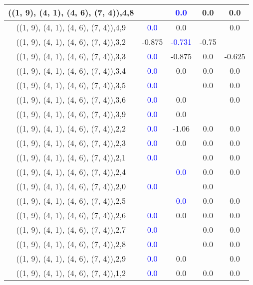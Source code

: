 \documentclass{article}
\begin{document}
\begin{center}
\begin{longtable}{|c|c|c|c|c|}
        	\hline
        	((1, 9), (4, 1), (4, 6), (7, 4)),4,8&& \textcolor{blue}{0.0}&0.0&0.0\\
        	\hline
        	((1, 9), (4, 1), (4, 6), (7, 4)),4,9& \textcolor{blue}{0.0}&0.0&&0.0\\
        	\hline
        	((1, 9), (4, 1), (4, 6), (7, 4)),3,2&-0.875& \textcolor{blue}{-0.731}&-0.75&\\
        	\hline
        	((1, 9), (4, 1), (4, 6), (7, 4)),3,3& \textcolor{blue}{0.0}&-0.875&0.0&-0.625\\
        	\hline
        	((1, 9), (4, 1), (4, 6), (7, 4)),3,4& \textcolor{blue}{0.0}&0.0&0.0&0.0\\
        	\hline
        	((1, 9), (4, 1), (4, 6), (7, 4)),3,5& \textcolor{blue}{0.0}&&0.0&0.0\\
        	\hline
        	((1, 9), (4, 1), (4, 6), (7, 4)),3,6& \textcolor{blue}{0.0}&0.0&&0.0\\
        	\hline
        	((1, 9), (4, 1), (4, 6), (7, 4)),3,9& \textcolor{blue}{0.0}&0.0&&\\
        	\hline
        	((1, 9), (4, 1), (4, 6), (7, 4)),2,2& \textcolor{blue}{0.0}&-1.06&0.0&0.0\\
        	\hline
        	((1, 9), (4, 1), (4, 6), (7, 4)),2,3& \textcolor{blue}{0.0}&0.0&0.0&0.0\\
        	\hline
        	((1, 9), (4, 1), (4, 6), (7, 4)),2,1& \textcolor{blue}{0.0}&&0.0&0.0\\
        	\hline
        	((1, 9), (4, 1), (4, 6), (7, 4)),2,4&& \textcolor{blue}{0.0}&0.0&0.0\\
        	\hline
        	((1, 9), (4, 1), (4, 6), (7, 4)),2,0& \textcolor{blue}{0.0}&&0.0&\\
        	\hline
        	((1, 9), (4, 1), (4, 6), (7, 4)),2,5&& \textcolor{blue}{0.0}&0.0&0.0\\
        	\hline
        	((1, 9), (4, 1), (4, 6), (7, 4)),2,6& \textcolor{blue}{0.0}&0.0&0.0&0.0\\
        	\hline
        	((1, 9), (4, 1), (4, 6), (7, 4)),2,7& \textcolor{blue}{0.0}&&0.0&0.0\\
        	\hline
        	((1, 9), (4, 1), (4, 6), (7, 4)),2,8& \textcolor{blue}{0.0}&&0.0&0.0\\
        	\hline
        	((1, 9), (4, 1), (4, 6), (7, 4)),2,9& \textcolor{blue}{0.0}&0.0&&0.0\\
        	\hline
        	((1, 9), (4, 1), (4, 6), (7, 4)),1,2& \textcolor{blue}{0.0}&0.0&0.0&0.0\\

\end{longtable}
\end{center}
\end{document}
